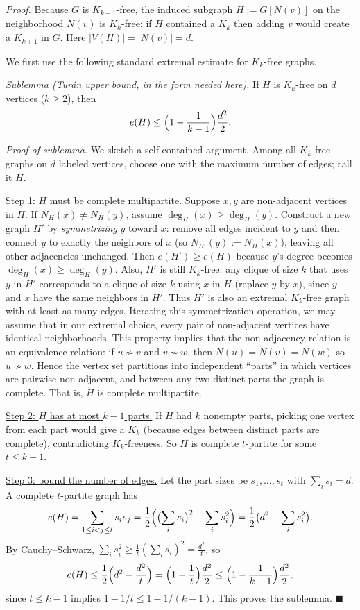 \emph{Proof.}
Because $G$ is $K_{k+1}$-free, the induced subgraph $H:=G[N(v)]$ on the
neighborhood $N(v)$ is $K_k$-free: if $H$ contained a $K_k$ then adding $v$ would
create a $K_{k+1}$ in $G$.
Here $|V(H)|=|N(v)|=d$.

We first use the following standard extremal estimate for $K_k$-free graphs.

\emph{Sublemma (Tur\'an upper bound, in the form needed here).}
If $H$ is $K_k$-free on $d$ vertices ($k\ge2$), then
\[
 e(H) \le \Bigl(1-\frac{1}{k-1}\Bigr)\frac{d^2}{2}.
\]

\emph{Proof of sublemma.}
We sketch a self-contained argument.
Among all $K_k$-free graphs on $d$ labeled vertices, choose one with the maximum
number of edges; call it $H$.

\underline{Step 1: $H$ must be complete multipartite.}
Suppose $x,y$ are non-adjacent vertices in $H$.
If $N_H(x)\neq N_H(y)$, assume $\deg_H(x)\ge \deg_H(y)$.
Construct a new graph $H'$ by \emph{symmetrizing} $y$ toward $x$:
remove all edges incident to $y$ and then connect $y$ to exactly the neighbors
of $x$ (so $N_{H'}(y):=N_H(x)$), leaving all other adjacencies unchanged.
Then $e(H')\ge e(H)$ because $y$'s degree becomes $\deg_H(x)\ge \deg_H(y)$.
Also, $H'$ is still $K_k$-free: any clique of size $k$ that uses $y$ in $H'$
corresponds to a clique of size $k$ using $x$ in $H$ (replace $y$ by $x$), since
$y$ and $x$ have the same neighbors in $H'$.
Thus $H'$ is also an extremal $K_k$-free graph with at least as many edges.
Iterating this symmetrization operation, we may assume that in our extremal
choice, every pair of non-adjacent vertices have identical neighborhoods.
This property implies that the non-adjacency relation is an equivalence relation:
if $u\not\sim v$ and $v\not\sim w$, then $N(u)=N(v)=N(w)$ so $u\not\sim w$.
Hence the vertex set partitions into independent ``parts'' in which vertices are
pairwise non-adjacent, and between any two distinct parts the graph is complete.
That is, $H$ is complete multipartite.

\underline{Step 2: $H$ has at most $k-1$ parts.}
If $H$ had $k$ nonempty parts, picking one vertex from each part would give a
$K_k$ (because edges between distinct parts are complete), contradicting
$K_k$-freeness.
So $H$ is complete $t$-partite for some $t\le k-1$.

\underline{Step 3: bound the number of edges.}
Let the part sizes be $s_1,\dots,s_t$ with $\sum_i s_i=d$.
A complete $t$-partite graph has
\[
 e(H)=\sum_{1\le i<j\le t} s_i s_j = \frac{1}{2}\Bigl(\bigl(\sum_i s_i\bigr)^2 - \sum_i s_i^2\Bigr)
=\frac{1}{2}\bigl(d^2-\sum_i s_i^2\bigr).
\]
By Cauchy--Schwarz, $\sum_i s_i^2\ge \frac{1}{t}(\sum_i s_i)^2=\frac{d^2}{t}$,
so
\[
 e(H)\le \frac{1}{2}\Bigl(d^2-\frac{d^2}{t}\Bigr)=\Bigl(1-\frac{1}{t}\Bigr)\frac{d^2}{2}
\le \Bigl(1-\frac{1}{k-1}\Bigr)\frac{d^2}{2},
\]
since $t\le k-1$ implies $1-1/t\le 1-1/(k-1)$.
This proves the sublemma.
\hfill $\blacksquare$

